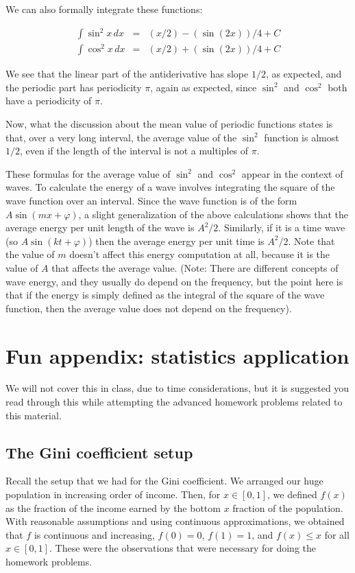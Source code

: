 \documentclass{amsart}
\begin{document}
We can also formally integrate these functions:

\begin{eqnarray*}
  \int \sin^2x \, dx & = & (x/2) - (\sin(2x))/4 + C\\
  \int \cos^2x \, dx & = & (x/2) + (\sin(2x))/4 + C
\end{eqnarray*}

We see that the linear part of the antiderivative has slope $1/2$, as
expected, and the periodic part has periodicity $\pi$, again as
expected, since $\sin^2$ and $\cos^2$ both have a periodicity of $\pi$.

Now, what the discussion about the mean value of periodic functions
states is that, over a very long interval, the average value of the
$\sin^2$ function is almost $1/2$, even if the length of the interval
is not a multiples of $\pi$.

These formulas for the average value of $\sin^2$ and $\cos^2$ appear
in the context of waves. To calculate the energy of a wave involves
integrating the square of the wave function over an interval. Since
the wave function is of the form $A \sin(mx + \varphi)$, a slight
generalization of the above calculations shows that the average energy
per unit length of the wave is $A^2/2$. Similarly, if it is a time
wave (so $A \sin(kt + \varphi)$) then the average energy per unit time
is $A^2/2$. Note that the value of $m$ doesn't affect this energy
computation at all, because it is the value of $A$ that affects the
average value. (Note: There are different concepts of wave energy, and
they usually do depend on the frequency, but the point here is that if
the energy is simply defined as the integral of the square of the wave
function, then the average value does not depend on the frequency).

\section{Fun appendix: statistics application}

We will not cover this in class, due to time considerations, but it is
suggested you read through this while attempting the advanced homework
problems related to this material.

\subsection{The Gini coefficient setup}

Recall the setup that we had for the Gini coefficient. We arranged our
huge population in increasing order of income. Then, for $x \in
[0,1]$, we defined $f(x)$ as the fraction of the income earned by the
bottom $x$ fraction of the population. With reasonable assumptions and
using continuous approximations, we obtained that $f$ is continuous
and increasing, $f(0) = 0$, $f(1) = 1$, and $f(x) \le x$ for all $x
\in [0,1]$. These were the observations that were necessary for doing
the homework problems.
\end{document}

